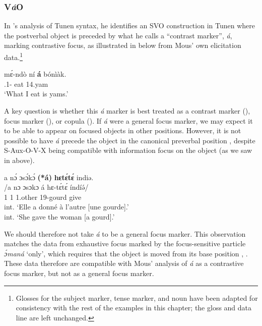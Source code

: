 \documentclass[output=paper,colorlinks,citecolor=brown
]{langscibook}
\begin{document}
\subsubsection{V\textit{á}O} \label{subsec:Vao}
In \citeauthor{Mous1997}'s \citeyearpar{Mous1997, Mous2003} analysis of Tunen syntax, he identifies an SVO construction in Tunen where the postverbal object is preceded by what he calls a ``contrast marker'', \textit{á}, marking contrastive focus, as illustrated in  below from Mous' own elicitation data.\footnote{Glosses for the subject marker, tense marker, and noun have been adapted for consistency with the rest of the examples in this chapter; the \CONTR{} gloss and data line are left unchanged.} 

\ea
\label{yamseat}
\gll mɛ́-ndò ní \textbf{á} bónìàk.\\
{\db}\SM{}.1\SG{}-\PRS{} eat \CONTR{} 14.yam \\
\glt
`What I eat is yams.' 

\z

A key question is whether this \textit{á} marker is best treated as a contrast marker (\CONTR{}), focus marker (\FOC{}), or copula (\COP{}). If \textit{á} were a general focus marker, we may expect it to be able to appear on focused objects in other positions. However, it is not possible to have \textit{á} precede the object in the canonical preverbal position , despite S-Aux-O-V-X being compatible with information focus on the object (as we saw in  above).

\glll
{\db}a nɔ́ ɔsɔ́kɔ́ \textbf{(*á)} \textbf{hɛtɛ́tɛ́} indiə. \\
/a nɔ ɔsɔkɔ á hɛ-tɛ́tɛ́ índíə́/ \\
{\db}1\SM{} \PST{}1{} 1.other \COP{} 19-gourd give \\
\glt
int. `Elle a donné à l'autre [une gourde]\textsubscript{\FOC{}}.' \\ int. `She gave the woman [a gourd]\textsubscript{\FOC{}}.' \jambox*{[PM 1541, 1549] }

\z\largerpage

We should therefore not take \textit{á} to be a general focus marker. This observation matches the data from exhaustive focus marked by the focus-sensitive particle \textit{ɔ́maná} `only', which requires that the object is moved from its base position , . These data therefore are compatible with Mous' \citeyearpar{Mous1997, Mous2003} analysis of \textit{á} as a contrastive focus marker, but not as a general focus marker.
\end{document}
